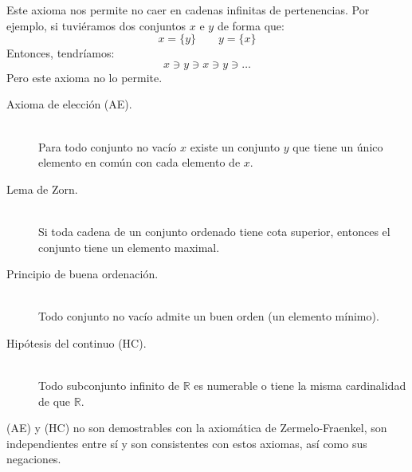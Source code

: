 \begin{enumerate}
        Este axioma nos permite no caer en cadenas infinitas de pertenencias. Por ejemplo, si tuviéramos dos conjuntos $x$ e $y$ de forma que:
        \begin{equation*}
            x = \{y\} \qquad y = \{x\}
        \end{equation*}
        Entonces, tendríamos:
        \begin{equation*}
            x \ni y \ni x \ni y \ni \ldots
        \end{equation*}
        Pero este axioma no lo permite.
\end{enumerate}

\begin{description}
    \item [Axioma de elección (AE).]~\\
        Para todo conjunto no vacío $x$ existe un conjunto $y$ que tiene un único elemento en común con cada elemento de $x$.
    \item [Lema de Zorn.]~\\
        Si toda cadena de un conjunto ordenado tiene cota superior, entonces el conjunto tiene un elemento maximal.
    \item [Principio de buena ordenación.]~\\
        Todo conjunto no vacío admite un buen orden (un elemento mínimo).
    \item [Hipótesis del continuo (HC).]~\\
        Todo subconjunto infinito de $\mathbb{R}$ es numerable o tiene la misma cardinalidad de que $\mathbb{R}$.
\end{description}
(AE) y (HC) no son demostrables con la axiomática de Zermelo-Fraenkel, son independientes entre sí y son consistentes con estos axiomas, así como sus negaciones.
